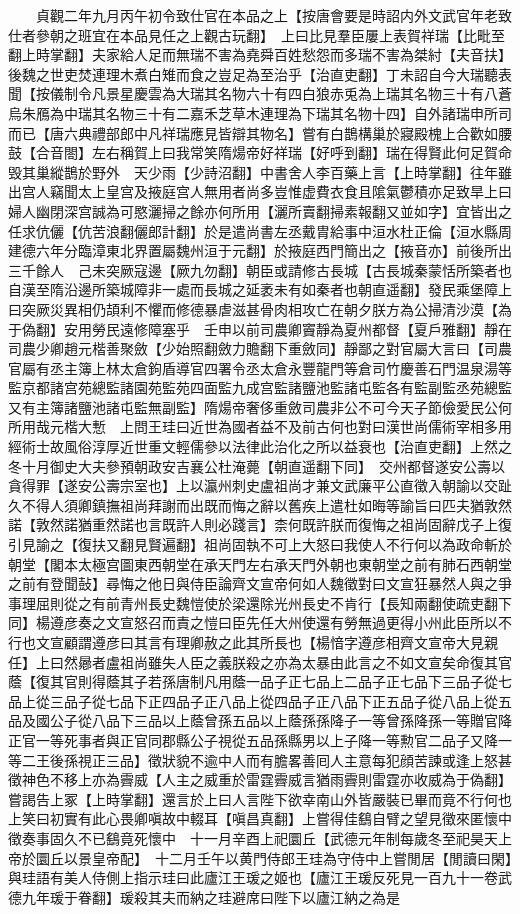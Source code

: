 　　貞觀二年九月丙午初令致仕官在本品之上【按唐會要是時詔内外文武官年老致仕者參朝之班宜在本品見任之上觀古玩翻】　上曰比見羣臣屢上表賀祥瑞【比毗至翻上時掌翻】夫家給人足而無瑞不害為堯舜百姓愁怨而多瑞不害為桀紂【夫音扶】後魏之世吏焚連理木煮白雉而食之豈足為至治乎【治直吏翻】丁未詔自今大瑞聽表聞【按儀制令凡景星慶雲為大瑞其名物六十有四白狼赤兎為上瑞其名物三十有八蒼烏朱鴈為中瑞其名物三十有二嘉禾芝草木連理為下瑞其名物十四】自外諸瑞申所司而已【唐六典禮部郎中凡祥瑞應見皆辯其物名】嘗有白鵲構巢於寢殿槐上合歡如腰鼓【合音閤】左右稱賀上曰我常笑隋煬帝好祥瑞【好呼到翻】瑞在得賢此何足賀命毁其巢縱鵲於野外　天少雨【少詩沼翻】中書舍人李百藥上言【上時掌翻】往年雖出宫人竊聞太上皇宫及掖庭宫人無用者尚多豈惟虚費衣食且隂氣鬱積亦足致旱上曰婦人幽閉深宫誠為可愍灑掃之餘亦何所用【灑所賣翻掃素報翻又並如字】宜皆出之任求伉儷【伉苦浪翻儷郎計翻】於是遣尚書左丞戴胄給事中洹水杜正倫【洹水縣周建德六年分臨漳東北界置屬魏州洹于元翻】於掖庭西門簡出之【掖音亦】前後所出三千餘人　己未突厥寇邊【厥九勿翻】朝臣或請修古長城【古長城秦蒙恬所築者也自漢至隋沿邊所築城障非一處而長城之延袤未有如秦者也朝直遥翻】發民乘堡障上曰突厥災異相仍頡利不懼而修德暴虐滋甚骨肉相攻亡在朝夕朕方為公掃清沙漠【為于偽翻】安用勞民遠修障塞乎　壬申以前司農卿竇靜為夏州都督【夏戶雅翻】靜在司農少卿趙元楷善聚斂【少始照翻斂力贍翻下重斂同】靜鄙之對官屬大言曰【司農官屬有丞主簿上林太倉鉤盾導官四署令丞太倉永豐龍門等倉司竹慶善石門温泉湯等監京都諸宫苑總監諸園苑監苑四面監九成宫監諸鹽池監諸屯監各有監副監丞苑總監又有主簿諸鹽池諸屯監無副監】隋煬帝奢侈重斂司農非公不可今天子節儉愛民公何所用哉元楷大慙　上問王珪曰近世為國者益不及前古何也對曰漢世尚儒術宰相多用經術士故風俗淳厚近世重文輕儒參以法律此治化之所以益衰也【治直吏翻】上然之　冬十月御史大夫參預朝政安吉襄公杜淹薨【朝直遥翻下同】　交州都督遂安公壽以貪得罪【遂安公壽宗室也】上以瀛州刺史盧祖尚才兼文武廉平公直徵入朝諭以交趾久不得人須卿鎮撫祖尚拜謝而出既而悔之辭以舊疾上遣杜如晦等諭旨曰匹夫猶敦然諾【敦然諾猶重然諾也言既許人則必踐言】柰何既許朕而復悔之祖尚固辭戊子上復引見諭之【復扶又翻見賢遍翻】祖尚固執不可上大怒曰我使人不行何以為政命斬於朝堂【閣本太極宫圖東西朝堂在承天門左右承天門外朝也東朝堂之前有肺石西朝堂之前有登聞鼔】尋悔之他日與侍臣論齊文宣帝何如人魏徵對曰文宣狂暴然人與之爭事理屈則從之有前青州長史魏愷使於梁還除光州長史不肯行【長知兩翻使疏吏翻下同】楊遵彦奏之文宣怒召而責之愷曰臣先任大州使還有勞無過更得小州此臣所以不行也文宣顧謂遵彦曰其言有理卿赦之此其所長也【楊愔字遵彦相齊文宣帝大見親任】上曰然曏者盧祖尚雖失人臣之義朕殺之亦為太暴由此言之不如文宣矣命復其官蔭【復其官則得蔭其子若孫唐制凡用蔭一品子正七品上二品子正七品下三品子從七品上從三品子從七品下正四品子正八品上從四品子正八品下正五品子從八品上從五品及國公子從八品下三品以上蔭曾孫五品以上蔭孫孫降子一等曾孫降孫一等贈官降正官一等死事者與正官同郡縣公子視從五品孫縣男以上子降一等勲官二品子又降一等二王後孫視正三品】徵狀貌不逾中人而有膽畧善囘人主意每犯顔苦諫或逢上怒甚徵神色不移上亦為霽威【人主之威重於雷霆霽威言猶雨霽則雷霆亦收威為于偽翻】嘗謁告上冢【上時掌翻】還言於上曰人言陛下欲幸南山外皆嚴裝已畢而竟不行何也上笑曰初實有此心畏卿嗔故中輟耳【嗔昌真翻】上嘗得佳鷂自臂之望見徵來匿懷中徵奏事固久不已鷂竟死懷中　十一月辛酉上祀圜丘【武德元年制每歲冬至祀昊天上帝於圜丘以景皇帝配】　十二月壬午以黄門侍郎王珪為守侍中上嘗閒居【閒讀曰閑】與珪語有美人侍側上指示珪曰此廬江王瑗之姬也【廬江王瑗反死見一百九十一卷武德九年瑗于眷翻】瑗殺其夫而納之珪避席曰陛下以廬江納之為是